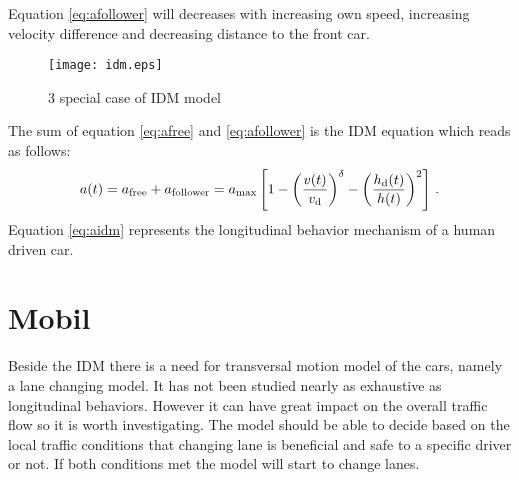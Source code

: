 		Equation \ref{eq:afollower} will decreases with increasing own speed, increasing velocity difference and decreasing distance to the front car.
		\begin{figure}[ht]
			\centering
			\texttt{[image: idm.eps]}
			\caption{3 special case of IDM model}
			\label{fig:idm}
		\end{figure}
		The sum of equation \ref{eq:afree} and \ref{eq:afollower} is the IDM equation which reads as follows:
		\begin{equation}
			a(t)=a_{\rm free}+a_{\rm follower}=a_{\rm max}\left [ 1 - \left ( \frac{v(t)}{v_{\rm d}} \right )^{\rm \delta} - \left ( \frac{h_{\rm d}(t)}{h(t)} \right )^2 \right ]\,.
			\label{eq:aidm}
		\end{equation}
		Equation \ref{eq:aidm} represents the longitudinal behavior mechanism of a human driven car.
	\section{Mobil} \label{sec:MOBIL}
		Beside the IDM there is a need for transversal motion model of the cars, namely a lane changing model. It has not been studied nearly as exhaustive as longitudinal behaviors. However it can have great impact on the overall traffic flow so it is worth investigating. The model should be able to decide based on the local traffic conditions that changing lane is beneficial and safe to a specific driver or not. If both conditions met the model will start to change lanes.

